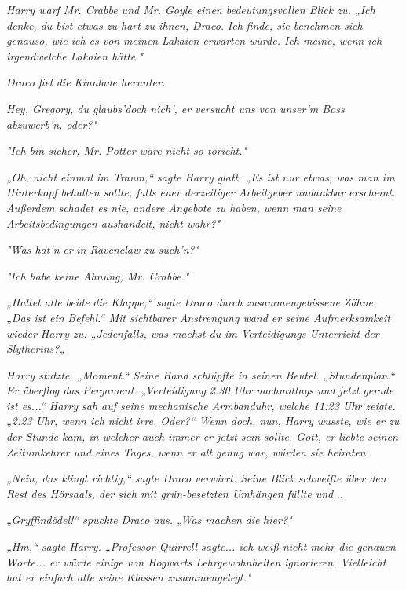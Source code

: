 {\emph{Harry warf Mr. Crabbe und Mr. Goyle einen bedeutungsvollen Blick zu. „Ich denke, du bist etwas zu hart zu ihnen, Draco.} \emph{\emph{Ich}} \emph{finde, sie benehmen sich genauso, wie ich es von} \emph{\emph{meinen}} \emph{Lakaien erwarten würde. Ich meine, wenn ich irgendwelche Lakaien hätte."}

\emph{Draco fiel die Kinnlade herunter.}

\emph{Hey, Gregory, du glaubs'doch nich', er versucht uns von unser'm Boss abzuwerb'n, oder?"}

\emph{"Ich bin sicher, Mr. Potter wäre nicht so töricht."}

\emph{„Oh, nicht einmal im Traum,“ sagte Harry glatt. „Es ist nur etwas, was man im Hinterkopf behalten sollte, falls euer derzeitiger Arbeitgeber undankbar erscheint. Außerdem schadet es nie, andere Angebote zu haben, wenn man seine Arbeitsbedingungen aushandelt, nicht wahr?"}

\emph{"Was hat'n} \emph{\emph{er}} \emph{in Ravenclaw zu such'n?"}

\emph{"Ich habe keine Ahnung, Mr. Crabbe."}

\emph{„Haltet alle beide} \emph{\emph{die Klappe,}“ sagte Draco durch zusammengebissene Zähne. „Das ist ein} \emph{\emph{Befehl.}“ Mit sichtbarer Anstrengung wand er seine Aufmerksamkeit wieder Harry zu. „Jedenfalls, was machst du im Verteidigungs-Unterricht der Slytherins?„}

\emph{Harry stutzte. „Moment.“ Seine Hand schlüpfte in seinen Beutel. „Stundenplan.“ Er überflog das Pergament. „Verteidigung 2:30 Uhr nachmittags und jetzt gerade ist es...“ Harry sah auf seine mechanische Armbanduhr, welche 11:23 Uhr zeigte. „2:23 Uhr, wenn ich nicht irre. Oder?“ Wenn doch, nun, Harry wusste, wie er zu der Stunde kam, in welcher auch immer er jetzt sein} \emph{\emph{sollte}. Gott, er liebte seinen Zeitumkehrer und eines Tages, wenn er alt genug war, würden sie heiraten.}

\emph{„Nein, das klingt richtig,“ sagte Draco verwirrt. Seine Blick schweifte über den Rest des Hörsaals, der sich mit grün-besetzten Umhängen füllte und...}

\emph{„\emph{Gryffindödel!}“ spuckte Draco aus. „Was machen} \emph{\emph{die}} \emph{hier?"}

\emph{„Hm,“ sagte Harry. „Professor Quirrell sagte... ich weiß nicht mehr die genauen Worte... er würde einige von Hogwarts Lehrgewohnheiten ignorieren. Vielleicht hat er einfach alle seine Klassen zusammengelegt."}

}
